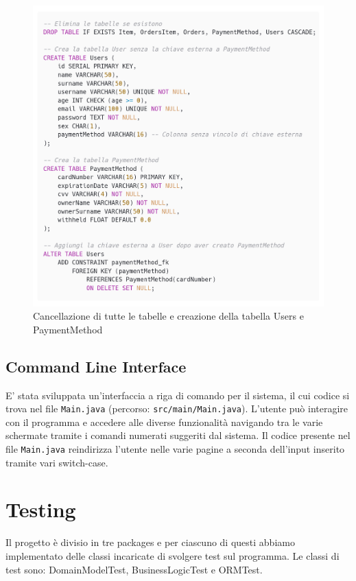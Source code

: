 \documentclass{article}
\begin{document}
\begin{figure}[h]
    \includegraphics[width=0.9\linewidth]{imgs/snippets/Code_SQLReset.png}
    \centering
    \caption{Cancellazione di tutte le tabelle e creazione della tabella Users e PaymentMethod}
    \label{code_SQLReset}
\end{figure}

\newpage

\subsection{Command Line Interface}
E' stata sviluppata un’interfaccia a riga di comando per il sistema, il cui codice si trova nel file \texttt{Main.java} (percorso: \texttt{src/main/Main.java}). L’utente può interagire con il programma e accedere alle diverse funzionalità navigando tra le varie schermate tramite i comandi numerati suggeriti dal sistema. Il codice presente nel file \texttt{Main.java} reindirizza l'utente nelle varie pagine a seconda dell'input inserito tramite vari switch-case.


\newpage

\section{Testing}
Il progetto è divisio in tre packages e per ciascuno di questi abbiamo implementato delle classi incaricate di svolgere test sul programma. Le classi di test sono: DomainModelTest, BusinessLogicTest e ORMTest.
\end{document}

